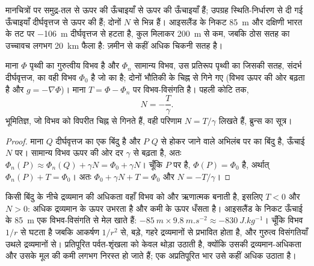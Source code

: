 मानचित्रों पर समुद्र-तल से ऊपर की ऊँचाइयाँ  से ऊपर की ऊँचाइयाँ हैं; उपग्रह स्थिति-निर्धारण से दी गई ऊँचाइयाँ दीर्घवृत्तज से ऊपर की हैं; दोनों $N$ से भिन्न हैं।  आइसलैंड के निकट \qty{+85}{m} और दक्षिणी भारत के तट पर \qty{-106}{m} दीर्घवृत्तज से हटता है, कुल मिलाकर \qty{200}{m} से कम, जबकि ठोस सतह का उच्चावच लगभग \qty{20}{km} फैला है:  ज़मीन से कहीं अधिक चिकनी सतह है।

\begin{proposition}[जियॉइड ऊँचाई और विभव-विसंगति]\label{prop:b1:isostasy-gravity:bruns}
माना $\Phi$ पृथ्वी का गुरुत्वीय विभव है और $\Phi_n$ सामान्य विभव, उस प्रतिरूप पृथ्वी का जिसकी सतह, संदर्भ दीर्घवृत्तज, का वही विभव $\Phi_0$ है जो  का है; दोनों भौतिकी के चिह्न से गिने गए (विभव ऊपर की ओर बढ़ता है और $g = -\nabla\Phi$)। माना $T = \Phi - \Phi_n$  पर विभव-विसंगति है। पहली कोटि तक,
\[
  N = -\frac{T}{\gamma} .
\]
भूमितिज्ञ, जो विभव को विपरीत चिह्न से गिनते हैं, वही परिणाम $N = T/\gamma$ लिखते हैं, ब्रुन्स का सूत्र।
\end{proposition}

\begin{proof}
माना $Q$ दीर्घवृत्तज का एक बिंदु है और $P$ $Q$ से होकर जाने वाले अभिलंब पर  का बिंदु है, ऊँचाई $N$ पर। सामान्य विभव ऊपर की ओर दर $\gamma$ से बढ़ता है, अतः $\Phi_n(P) \approx \Phi_n(Q) + \gamma N = \Phi_0 +
\gamma N$। चूँकि $P$  पर है, $\Phi(P) = \Phi_0$ है, अर्थात् $\Phi_n(P) + T = \Phi_0$। अतः $\Phi_0 + \gamma N + T = \Phi_0$ और $N =
-T/\gamma$।
\end{proof}

किसी बिंदु के नीचे द्रव्यमान की अधिकता वहाँ विभव को और ऋणात्मक बनाती है, इसलिए $T < 0$ और $N > 0$:  अधिक द्रव्यमान के ऊपर उभरता है और कमी के ऊपर धँसता है। आइसलैंड के निकट ऊँचाई के \qty{85}{m} एक विभव-विसंगति से मेल खाते हैं: $-\qty{85}{m}\times\qty{9.8}{m.s^{-2}} \approx \qty{-830}{J.kg^{-1}}$। चूँकि विभव $1/r$ से घटता है जबकि आकर्षण $1/r^2$ से,  बड़े, गहरे द्रव्यमानों से प्रभावित होता है, और गुरुत्व विसंगतियाँ उथले द्रव्यमानों से। प्रतिपूरित पर्वत-शृंखला  को केवल थोड़ा उठाती है, क्योंकि उसकी द्रव्यमान-अधिकता और उसके मूल की कमी लगभग निरस्त हो जाते हैं; एक अप्रतिपूरित भार उसे कहीं अधिक उठाता है।

